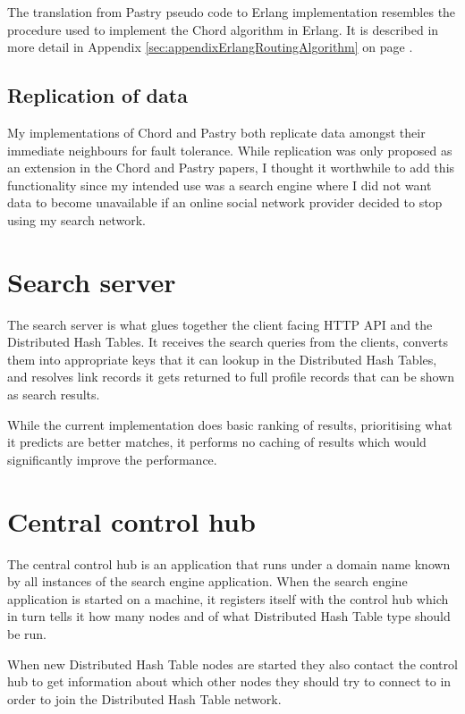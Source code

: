 The translation from Pastry pseudo code to Erlang implementation resembles the procedure used to implement the Chord algorithm in Erlang. It is described in more detail in Appendix \ref{sec:appendixErlangRoutingAlgorithm} on page \pageref{sec:appendixErlangRoutingAlgorithm}.

\subsection{Replication of data}
My implementations of Chord and Pastry both replicate data amongst their immediate neighbours for fault tolerance. While replication was only proposed as an extension in the Chord \cite{chord} and Pastry \cite{pastry} papers, I thought it worthwhile to add this functionality since my intended use was a search engine where I did not want data to become unavailable if an online social network provider decided to stop using my search network.

\section{Search server}
The search server is what glues together the client facing HTTP API and the Distributed Hash Tables. It receives the search queries from the clients, converts them into appropriate keys that it can lookup in the Distributed Hash Tables, and resolves link records it gets returned to full profile records that can be shown as search results.

While the current implementation does basic ranking of results, prioritising what it predicts are better matches, it performs no caching of results which would significantly improve the performance.

\section{Central control hub}
The central control hub is an application that runs under a domain name known by all instances of the search engine application.
When the search engine application is started on a machine, it registers itself with the control hub which in turn tells it how many nodes and of what Distributed Hash Table type should be run.

When new Distributed Hash Table nodes are started they also contact the control hub to get information about which other nodes they should try to connect to in order to join the Distributed Hash Table network.


